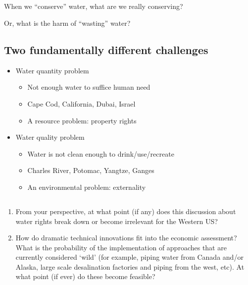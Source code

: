 \documentclass[]{article}
\providecommand{\tightlist}{%
  \setlength{\itemsep}{0pt}\setlength{\parskip}{0pt}}
\begin{document}
\hypertarget{section-4}{%
\subsection{}\label{section-4}}

When we ``conserve'' water, what are we really conserving?

Or, what is the harm of ``wasting'' water?

\hypertarget{two-fundamentally-different-challenges}{%
\subsection{Two fundamentally different
challenges}\label{two-fundamentally-different-challenges}}

\begin{itemize}
\tightlist
\item
  Water quantity problem

  \begin{itemize}
  \tightlist
  \item
    Not enough water to suffice human need
  \item
    Cape Cod, California, Dubai, Israel
  \item
    A resource problem: property rights
  \end{itemize}
\item
  Water quality problem

  \begin{itemize}
  \tightlist
  \item
    Water is not clean enough to drink/use/recreate
  \item
    Charles River, Potomac, Yangtze, Ganges
  \item
    An environmental problem: externality
  \end{itemize}
\end{itemize}

\hypertarget{section-5}{%
\subsection{}\label{section-5}}

\begin{enumerate}
\def\labelenumi{\arabic{enumi}.}
\tightlist
\item
  From your perspective, at what point (if any) does this discussion
  about water rights break down or become irrelevant for the Western
  US?\\
\item
  How do dramatic technical innovations fit into the economic
  assessment? What is the probability of the implementation of
  approaches that are currently considered `wild' (for example, piping
  water from Canada and/or Alaska, large scale desalination factories
  and piping from the west, etc). At what point (if ever) do these
  become feasible?
\end{enumerate}
\end{document}
